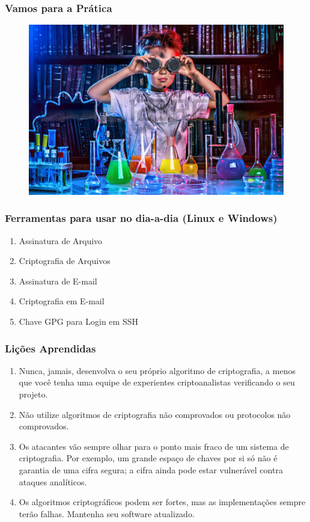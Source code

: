 \documentclass[compress]{beamer}
\begin{document}
\begin{frame}
\frametitle{Vamos para a Prática}
	\begin{figure}[h]
		\includegraphics[width=\textwidth]{pics/pratica}
	\end{figure}
\end{frame}

\begin{frame}
\frametitle{Ferramentas para usar no dia-a-dia (Linux e Windows)}
		\begin{enumerate}
			\item<+->{Assinatura de Arquivo}
			\item<+->{Criptografia de Arquivos}
			\item<+->{Assinatura de E-mail}
			\item<+->{Criptografia em E-mail}
			\item<+->{Chave GPG para Login em SSH}
		\end{enumerate}
\end{frame}

\begin{frame}
\frametitle{Lições Aprendidas}
\justifying
	\begin{enumerate}
		\item<+->{Nunca, jamais, desenvolva o seu próprio algoritmo de criptografia, a menos que você tenha uma equipe de experientes criptoanalistas verificando o seu projeto.}
		\item<+->{Não utilize algoritmos de criptografia não comprovados ou protocolos não comprovados.}
		\item<+->{Os atacantes vão sempre olhar para o ponto mais fraco de um sistema de criptografia. Por exemplo, um grande espaço de chaves por si só não é garantia de uma cifra segura; a cifra ainda pode estar vulnerável contra ataques analíticos.}
		\item<+->{Os algoritmos criptográficos podem ser fortes, mas as implementações sempre terão falhas. Mantenha seu software atualizado.}
	\end{enumerate}
\end{frame}
\end{document}
